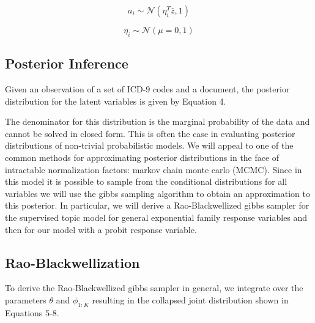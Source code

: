 \documentclass{article}
\begin{document}
\begin{equation}
a_{i}\sim\mathcal{N}\left(\eta_{i}^{T}\bar{z},1\right)\end{equation}


\begin{equation}
\eta_{i}\sim\mathcal{N}\left(\mu=0,1\right)\end{equation}



\subsection{Posterior Inference}

Given an observation of a set of ICD-9 codes and a document, the posterior
distribution for the latent variables is given by Equation 4.

The denominator for this distribution is the marginal probability
of the data and cannot be solved in closed form. This is often the
case in evaluating posterior distributions of non-trivial probabilistic
models. We will appeal to one of the common methods for approximating
posterior distributions in the face of intractable normalization factors:
markov chain monte carlo (MCMC). Since in this model it is possible
to sample from the conditional distributions for all variables we
will use the gibbs sampling algorithm to obtain an approximation to
this posterior. In particular, we will derive a Rao-Blackwellized
gibbs sampler for the supervised topic model for general exponential
family response variables and then for our model with a probit response
variable.



\subsection{Rao-Blackwellization}

To derive the Rao-Blackwellized gibbs sampler in general, we integrate
over the parameters $\theta$ and $\phi_{1:K}$ resulting in the
collapsed joint distribution shown in Equations 5-8.
\end{document}
